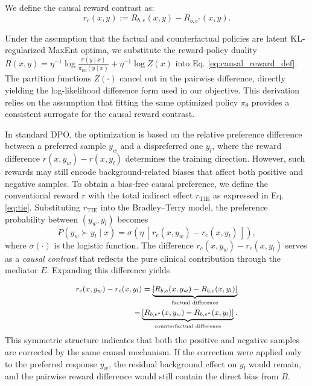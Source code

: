 We define the causal reward contrast as:
\begin{equation}
    r_c(x,y) := R_{b,e}(x,y) - R_{b,e^*}(x,y).
    \label{eq:causal_reward_def}
\end{equation}

Under the assumption that the factual and counterfactual policies are latent KL-regularized MaxEnt optima, we substitute the reward-policy duality $R(x,y) = \eta^{-1} \log \frac{\pi(y \mid x)}{\pi_{\text{ref}}(y \mid x)} + \eta^{-1} \log Z(x)$ into Eq. \ref{eq:causal_reward_def}. The partition functions $Z(\cdot)$ cancel out in the pairwise difference, directly yielding the log-likelihood difference form used in our objective. This derivation relies on the assumption that fitting the same optimized policy $\pi_{\theta}$ provides a consistent surrogate for the causal reward contrast.

In standard DPO, the optimization is based on the relative preference difference 
between a preferred sample $y_w$ and a dispreferred one $y_l$, where the reward difference $r(x,y_w)-r(x,y_l)$ determines the training direction. However, such rewards may still encode background-related biases that affect both positive and negative samples. To obtain a bias-free causal preference, we define the conventional reward $r$ 
with the total indirect effect $r_\text{TIE}$ as expressed in Eq. \ref{eq:tie}. Substituting $r_{\text{TIE}}$ into the Bradley--Terry model, the preference probability between $(y_w,y_l)$ becomes
\begin{equation}
P(y_w \succ y_l \mid x)
= \sigma\!\left(\eta\,[\,r_{c}(x,y_w)-r_{c}(x,y_l)\,]\right),
\end{equation}
where $\sigma(\cdot)$ is the logistic function. 
The difference $r_{c}(x,y_w)-r_{c}(x,y_l)$ serves as a \textit{causal contrast} that reflects the pure clinical contribution through the mediator $E$. Expanding this difference yields

\begin{equation}
\small
\begin{aligned}
    r_{c}(x,y_w)-r_{c}(x,y_l)
= \underbrace{[R_{b,e}(x,y_w)-R_{b,e}(x,y_l)]}_{\text{factual difference}}
 &\\-\underbrace{[R_{b,e^*}(x,y_w)-R_{b,e^*}(x,y_l)]}_{\text{counterfactual difference}}.
\end{aligned} 
\label{eq:preference}
\end{equation}
This symmetric structure indicates that both the positive and negative samples 
are corrected by the same causal mechanism.  
If the correction were applied only to the preferred response $y_w$, 
the residual background effect on $y_l$ would remain, 
and the pairwise reward difference would still contain the direct bias from $B$. 

